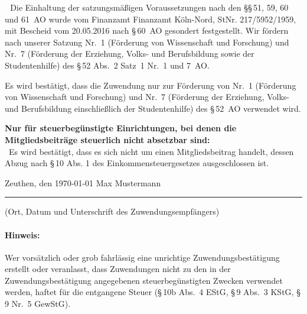\documentclass[11pt,ngerman]{scrartcl}
\newcommand{\mychecked}{\scalebox{1.5}{\XBox}~} %
\newcommand{\unmychecked}{\scalebox{1.5}{\Square}}
\begin{document}
\mychecked\,Die Einhaltung der satzungsmäßigen Voraussetzungen nach den §§\,51, 59, 60 und 61~AO wurde vom Finanzamt Finanzamt Köln-Nord, StNr. 217/5952/1959, mit Bescheid vom 20.05.2016 nach §\,60~AO gesondert festgestellt. Wir fördern nach unserer Satzung Nr.~1 (Förderung von Wissenschaft und Forschung) und Nr.~7 (Förderung der Erziehung, Volks- und Berufsbildung sowie der Studentenhilfe) des §\,52 Abs.~2 Satz~1 Nr.~1 und 7~AO.
 
\begin{mdframed}[style=MyFormStyle]%
\footnotesize Es wird bestätigt, dass die Zuwendung nur zur Förderung von Nr.~1 (Förderung von Wissenschaft und Forschung) und  Nr.~7 (Förderung der Erziehung, Volks- und Berufsbildung einschließlich der Studentenhilfe) des §\,52~AO verwendet wird. \vspace{0.5em}

\textbf{Nur für steuerbegünstigte Einrichtungen, bei denen die Mitgliedsbeiträge steuerlich nicht absetzbar sind:} \\
\unmychecked\, Es wird bestätigt, dass es sich nicht um einen Mitgliedsbeitrag handelt, dessen Abzug nach §\,10 Abs. 1 des Einkommensteuergesetzes ausgeschlossen ist. 

\end{mdframed} 


\vspace*{2.5em} 

Zeuthen, den \today \hspace*{20em} Max Mustermann

\hrule

\vspace*{0.5em} (Ort, Datum und Unterschrift des Zuwendungsempfängers) 

\paragraph{Hinweis:} Wer vorsätzlich oder grob fahrlässig eine unrichtige Zuwendungsbestätigung erstellt oder veranlasst, dass 
Zuwendungen nicht zu den in der Zuwendungsbestätigung angegebenen steuerbegünstigten Zwecken verwendet 
werden, haftet für die entgangene Steuer (§\,10b Abs.~4 EStG, §\,9 Abs.~3 KStG, §\,9 Nr.~5 GewStG). 
\end{document}
